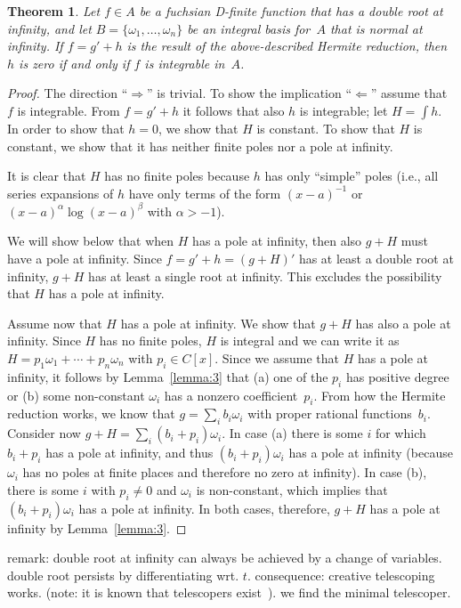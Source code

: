 \documentclass{sig-alternate}
\newtheorem{theorem}{Theorem}
\begin{document}
\begin{theorem}
Let $f\in A$ be a fuchsian D-finite function that has a double root at
infinity, and let $B=\{\omega_1,\ldots,\omega_n\}$ be an integral basis for~$A$
that is normal at infinity.
If $f=g'+h$ is the result of the above-described Hermite reduction,
then $h$ is zero if and only if $f$ is integrable in~$A$.
\end{theorem}
\begin{proof}
The direction ``$\Rightarrow$'' is trivial. To show the implication
``$\Leftarrow$'' assume that $f$ is integrable. From $f=g'+h$ it follows that
also $h$ is integrable; let $H=\int h$.  In order to show that $h=0$, we show
that $H$ is constant.  To show that $H$ is constant, we show that it has
neither finite poles nor a pole at infinity.

It is clear that $H$ has no finite poles because $h$ has only ``simple'' poles
(i.e., all series expansions of $h$ have only terms of the form
$(x-a)^{-1}$ or $(x-a)^\alpha\log(x-a)^\beta$ with $\alpha>-1$).

We will show below that when $H$ has a pole at infinity, then also $g+H$ must
have a pole at infinity.  Since $f=g'+h=(g+H)'$ has at least a double root at
infinity, $g+H$ has at least a single root at infinity. This excludes the
possibility that $H$ has a pole at infinity.

Assume now that $H$ has a pole at infinity. We show that $g+H$ has also a pole at infinity.
Since $H$ has no finite poles, $H$ is integral and we can write it as
$H=p_1\omega_1+\cdots+p_n\omega_n$ with $p_i\in C[x]$.
Since we assume that $H$ has a pole at infinity, it follows by Lemma~\ref{lemma:3} that
(a) one of the $p_i$ has positive degree or
(b) some non-constant $\omega_i$ has a nonzero coefficient~$p_i$.
From how the Hermite reduction works, we know that $g=\sum_i b_i\omega_i$
with proper rational functions~$b_i$. Consider now $g+H=\sum_i (b_i+p_i)\omega_i$.
In case (a) there is some $i$ for which $b_i+p_i$ has a pole at infinity,
and thus $(b_i+p_i)\omega_i$ has a pole at infinity (because $\omega_i$ has
no poles at finite places and therefore no zero at infinity).
In case (b), there is some $i$ with $p_i\neq0$ and $\omega_i$ is non-constant,
which implies that $(b_i+p_i)\omega_i$ has a pole at infinity.
In both cases, therefore, $g+H$ has a pole at infinity by Lemma~\ref{lemma:3}.
\end{proof}

remark: double root at infinity can always be achieved by a change of variables.
double root persists by differentiating wrt. $t$. consequence: creative telescoping works.
(note: it is known that telescopers exist~\cite{zeilberger90,chyzak00}).
we find the minimal telescoper.
\end{document}
